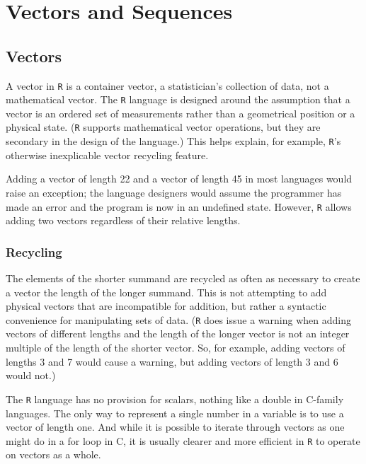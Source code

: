 \documentclass[a4paper,12pt]{article}
\begin{document}
\newpage
\section{Vectors and Sequences}
\subsection{Vectors}




A vector in \texttt{R} is a container vector, a statistician's collection of data, not a mathematical vector. The \texttt{R} language is designed around the assumption that a vector is an ordered set of measurements rather than a geometrical position or a physical state. (\texttt{R} supports mathematical vector operations, but they are secondary in the design of the language.) This helps explain, for example, \texttt{R}'s otherwise inexplicable vector recycling feature.

Adding a vector of length 22 and a vector of length 45 in most languages would raise an exception; the language designers would assume the programmer has made an error and the program is now in an undefined state. However, \texttt{R} allows adding two vectors regardless of their relative lengths.

\subsubsection{Recycling}
 The elements of the shorter summand are recycled as often as necessary to create a vector the length of the longer summand. This is not attempting to add physical vectors that are incompatible for addition, but rather a syntactic convenience for manipulating sets of data. (\texttt{R} does issue a warning when adding vectors of different lengths and the length of the longer vector is not an integer multiple of the length of the shorter vector. So, for example, adding vectors of lengths 3 and 7 would cause a warning, but adding vectors of length 3 and 6 would not.)

The \texttt{R}  language has no provision for scalars, nothing like a double in C-family languages. The only way to represent a single number in a variable is to use a vector of length one. And while it is possible to iterate through vectors as one might do in a for loop in C, it is usually clearer and more efficient in \texttt{R} to operate on vectors as a whole.
\end{document}
